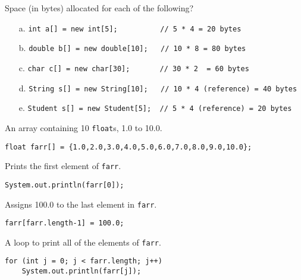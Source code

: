 \begin{ANS}
\item  
Space (in bytes) allocated for each of the following?

\begin{enumerate}
\scriptsize
\item[a.]  \verb|int a[] = new int[5];       |{\color{cyan}\verb|   // 5 * 4 = 20 bytes|}
\item[b.]  \verb|double b[] = new double[10];|{\color{cyan}\verb|   // 10 * 8 = 80 bytes|}
\item[c.]  \verb|char c[] = new char[30];    |{\color{cyan}\verb|   // 30 * 2  = 60 bytes|}
\item[d.]  \verb|String s[] = new String[10];|{\color{cyan}\verb|   // 10 * 4 (reference) = 40 bytes|}
\item[e.]  \verb|Student s[] = new Student[5]; |{\color{cyan}\verb| // 5 * 4 (reference) = 20 bytes|} 
\normalsize
\end{enumerate}


\item  An array containing 10 {\tt float}s, 1.0 to 10.0.

\begin{jjjlisting}
\begin{lstlisting}
float farr[] = {1.0,2.0,3.0,4.0,5.0,6.0,7.0,8.0,9.0,10.0};
\end{lstlisting}
\end{jjjlisting}

\item  Prints the first element of {\tt farr}.

\begin{jjjlisting}
\begin{lstlisting}
System.out.println(farr[0]);
\end{lstlisting}
\end{jjjlisting}

\item  Assigns 100.0 to the last element in {\tt farr}.

\begin{jjjlisting}
\begin{lstlisting}
farr[farr.length-1] = 100.0;
\end{lstlisting}
\end{jjjlisting}

\item  A loop to print all of the elements of {\tt farr}.

\begin{jjjlisting}
\begin{lstlisting}
for (int j = 0; j < farr.length; j++)
    System.out.println(farr[j]);
\end{lstlisting}
\end{jjjlisting}


\end{ANS}

